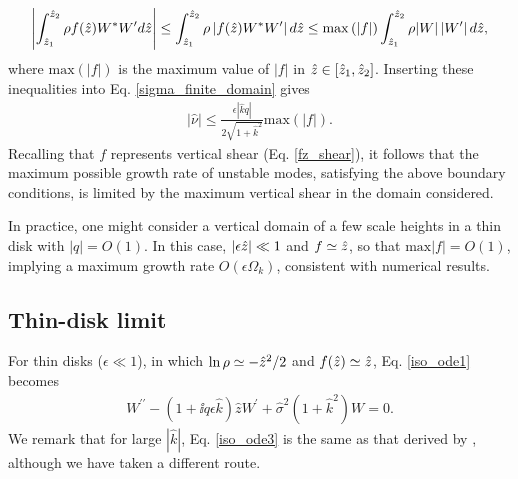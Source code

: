 \begin{align}
  \left|\int_{\hat{z}_1}^{\hat{z}_2}\rho
    f(\hat{z}) W^*W^\prime d\hat{z}\right|\leq \int_{\hat{z}_1}^{\hat{z}_2}\rho
  \left|f(\hat{z})W^*W^\prime \right|d\hat{z}
  \leq
  \mathrm{max}\left(|f|\right)\int_{\hat{z}_1}^{\hat{z}_2}\rho
  |W|\left|W^\prime \right|d\hat{z},
\end{align}
where $\mathrm{max}(|f|)$ is the maximum value of $|f|$ in
$\hat{z}\in[\hat{z}_1,\hat{z}_2]$. Inserting these inequalities into
Eq. \ref{sigma_finite_domain} gives
\begin{align}\label{max_growth}
  |\hat{\nu}|\leq
  \frac{\epsilon |\hat{k} q|}{2\sqrt{1+\hat{k}^2}}\mathrm{max}(|f|). 
\end{align}
Recalling that $f$ represents vertical shear (Eq. \ref{fz_shear}), it
follows that the maximum possible growth rate of unstable modes,
satisfying the above boundary conditions, is limited by the maximum
vertical shear in the domain considered.  

In practice, one might consider a vertical domain of a few scale 
heights in a thin disk with $|q|=O(1)$. In this case, $|\epsilon\hat{z}|\ll1$ and  
$f\simeq \hat{z}$, so that $\mathrm{max}|f| = O(1)$, implying a
maximum growth rate $O(\epsilon \Omega_k)$, consistent with numerical
results. 


\subsection{Thin-disk limit}
For thin disks ($\epsilon\ll1$), in which 
$\ln\rho\simeq -\hat{z}^2/2$ and $f(\hat{z})\simeq \hat{z}$, 
Eq. \ref{iso_ode1} becomes  
\begin{align}\label{iso_ode3}
  W^{\prime\prime} - \left(1 + \ii q\epsilon
    \hat{k}\right)\hat{z}W^\prime  +
  \hat{\sigma}^2\left(1+\hat{k}^2\right)W = 
  0.
\end{align}
We remark that for large $|\hat{k}|$, Eq. \ref{iso_ode3} is the same as
that derived by \cite{nelson13}, although we have taken a different
route.  

